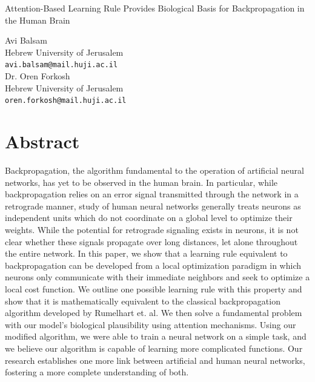 \documentclass[12pt]{article}
\begin{document}
\begin{center}
\Large
Attention-Based Learning Rule Provides Biological Basis for Backpropagation in the Human Brain
\end{center}

\begin{center}
Avi Balsam \\
Hebrew University of Jerusalem\\
\verb+avi.balsam@mail.huji.ac.il+\\
\vspace{0.2cm}
Dr. Oren Forkosh\\
Hebrew University of Jerusalem\\
\verb+oren.forkosh@mail.huji.ac.il+
\end{center}

\section{Abstract}
Backpropagation, the algorithm fundamental to the operation of artificial neural networks, has yet to be observed in the human brain. In particular, while backpropagation relies on an error signal transmitted through the network in a retrograde manner, study of human neural networks generally treats neurons as independent units which do not coordinate on a global level to optimize their weights. While the potential for retrograde signaling exists in neurons, it is not clear whether these signals propagate over long distances, let alone throughout the entire network. In this paper, we show that a learning rule equivalent to backpropagation can be developed from a local optimization paradigm in which neurons only communicate with their immediate neighbors and seek to optimize a local cost function. We outline one possible learning rule with this property and show that it is mathematically equivalent to the classical backpropagation algorithm developed by Rumelhart et. al. We then solve a fundamental problem with our model's biological plausibility using attention mechanisms. Using our modified algorithm, we were able to train a neural network on a simple task, and we believe our algorithm is capable of learning more complicated functions. Our research establishes one more link between artificial and human neural networks, fostering a more complete understanding of both.
\end{document}
